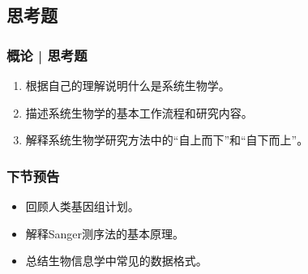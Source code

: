 \subsection{思考题}
\begin{frame}
  \frametitle{概论 | 思考题}
  \begin{enumerate}
    \item 根据自己的理解说明什么是系统生物学。
    \item 描述系统生物学的基本工作流程和研究内容。
    \item 解释系统生物学研究方法中的“自上而下”和“自下而上”。
  \end{enumerate}
\end{frame}

\begin{frame}
  \frametitle{下节预告}
  \begin{itemize}
    \item 回顾人类基因组计划。
    \item 解释Sanger测序法的基本原理。
    \item 总结生物信息学中常见的数据格式。
  \end{itemize}
\end{frame}




